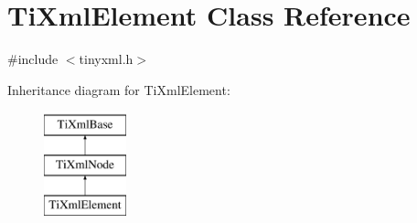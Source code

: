 \hypertarget{classTiXmlElement}{\section{Ti\-Xml\-Element Class Reference}
\label{classTiXmlElement}
}


{\ttfamily \#include $<$tinyxml.\-h$>$}

Inheritance diagram for Ti\-Xml\-Element\-:\begin{figure}[H]
\begin{center}
\leavevmode
\includegraphics[height=3.000000cm]{classTiXmlElement}
\end{center}
\end{figure}
